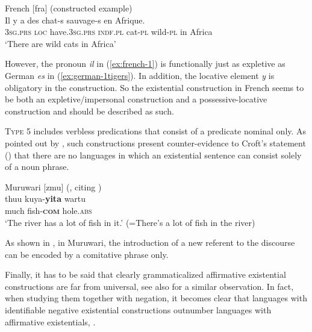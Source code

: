 \documentclass[output=paper,chinesefont,colorlinks,citecolor=brown]{langscibook}
\begin{document}
\begin{exe}
\ex French [fra] (constructed example)\label{ex:french-1}\\
\gll Il y a des chat-s sauvage-s en Afrique.\\
3\textsc{sg.prs} \textsc{loc} have.\textsc{3sg.prs} \textsc{indf.pl} cat-\textsc{pl} wild-\textsc{pl} in Africa\\
\glt ‘There are wild cats in Africa’
\end{exe}
However, the pronoun \textit{il} in (\ref{ex:french-1}) is functionally just as expletive as German \textit{es} in (\ref{ex:german-1tigers}). In addition, the locative element \textit{y} is obligatory in the construction. So the existential construction in French seems to be both an expletive/impersonal construction and a possessive-locative construction and should be described as such.

\textsc{Type 5} includes verbless predications that consist of a predicate nominal only. As pointed out by , such constructions present coun\-ter-evidence to Croft’s statement (\citeyear[19]{Croft1991}) that there are no languages in which an existential sentence can consist solely of a noun phrase.

\begin{exe}
\ex Muruwari [zmu] (, citing {\citet[73]{Oates1988}}) \label{ex:muruwari-1}\\
\gll thuu kuya-\textbf{yita} wartu\\
	much fish-\textsc{\textbf{com}} hole.\textsc{abs}\\
	\glt `The river has a lot of fish in it.' (=There's a lot of fish in
            the river)
\end{exe}
As shown in , in Muruwari, the introduction of a new referent to the discourse can be encoded by a comitative phrase only.

Finally, it has to be said that clearly grammaticalized affirmative existential constructions are far from universal, see also \citet[50-51]{creissels2019} for a similar observation. In fact, when studying them together with negation, it becomes clear that languages with identifiable negative existential constructions outnumber languages with affirmative existentials, \citep[117]{Veselinova2013}.
\end{document}
